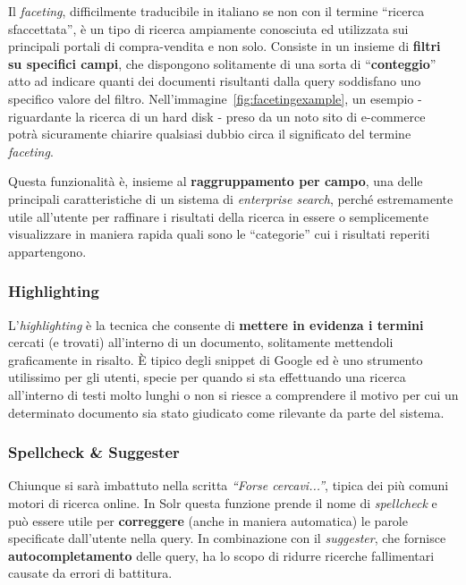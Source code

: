 Il \textit{faceting}, difficilmente traducibile in italiano se non con il termine “ricerca sfaccettata”, è un tipo di ricerca ampiamente conosciuta ed utilizzata sui principali portali di compra-vendita e non solo.
Consiste in un insieme di \textbf{filtri su specifici campi}, che dispongono solitamente di una sorta di “\textbf{conteggio}” atto ad indicare quanti dei documenti risultanti dalla query soddisfano uno specifico valore del filtro. Nell’immagine~\ref{fig:facetingexample}, un esempio - riguardante la ricerca di un hard disk - preso da un noto sito di e-commerce potrà sicuramente chiarire qualsiasi dubbio circa il significato del termine \textit{faceting}.

\vspace{1em} 
Questa funzionalità è, insieme al \textbf{raggruppamento per campo}, una delle principali caratteristiche di un sistema di \textit{enterprise search}, perché estremamente utile all’utente per raffinare i risultati della ricerca in essere o semplicemente visualizzare in maniera rapida quali sono le “categorie” cui i risultati reperiti appartengono.

\subsubsection{Highlighting}

L’\textit{highlighting} è la tecnica che consente di \textbf{mettere in evidenza i termini} cercati (e trovati) all’interno di un documento, solitamente mettendoli graficamente in risalto. È tipico degli snippet di Google ed è uno strumento utilissimo per gli utenti, specie per quando si sta effettuando una ricerca all’interno di testi molto lunghi o non si riesce a comprendere il motivo per cui un determinato documento sia stato giudicato come rilevante da parte del sistema.


\subsubsection{Spellcheck \& Suggester}

Chiunque si sarà imbattuto nella scritta \textit{“Forse cercavi...”}, tipica dei più comuni motori di ricerca online. In Solr questa funzione prende il nome di \textit{spellcheck} e può essere utile per \textbf{correggere} (anche in maniera automatica) le parole specificate dall’utente nella query. In combinazione con il \textit{suggester}, che fornisce \textbf{autocompletamento} delle query, ha lo scopo di ridurre ricerche fallimentari causate da errori di battitura.


